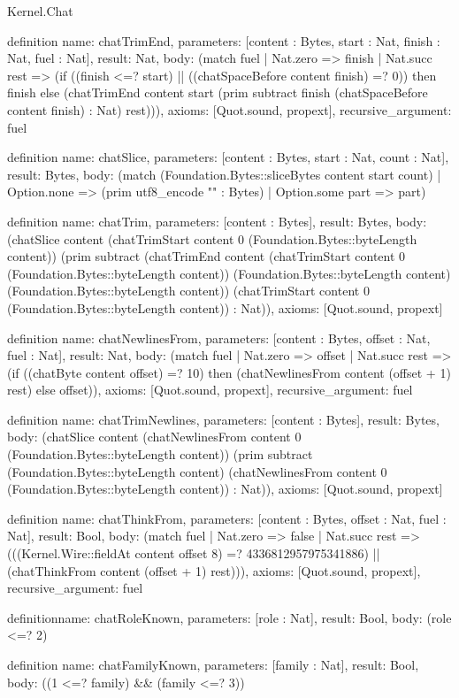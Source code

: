 \begin{lexlean}{Kernel.Chat}
\begin{semanticmodule}
definition{
  name: chatTrimEnd,
  parameters: [content : Bytes, start : Nat, finish : Nat, fuel : Nat],
  result: Nat,
  body: (match fuel
    | Nat.zero => finish
    | Nat.succ rest => (if ((finish <=? start) || ((chatSpaceBefore content finish) =? 0)) then finish else (chatTrimEnd content start (prim subtract finish (chatSpaceBefore content finish) : Nat) rest))),
  axioms: [Quot.sound, propext],
  recursive_argument: fuel
}

definition{
  name: chatSlice,
  parameters: [content : Bytes, start : Nat, count : Nat],
  result: Bytes,
  body: (match (Foundation.Bytes::sliceBytes content start count)
    | Option.none => (prim utf8_encode "" : Bytes)
    | Option.some part => part)
}

definition{
  name: chatTrim,
  parameters: [content : Bytes],
  result: Bytes,
  body: (chatSlice content (chatTrimStart content 0 (Foundation.Bytes::byteLength content)) (prim subtract (chatTrimEnd content (chatTrimStart content 0 (Foundation.Bytes::byteLength content)) (Foundation.Bytes::byteLength content) (Foundation.Bytes::byteLength content)) (chatTrimStart content 0 (Foundation.Bytes::byteLength content)) : Nat)),
  axioms: [Quot.sound, propext]
}

definition{
  name: chatNewlinesFrom,
  parameters: [content : Bytes, offset : Nat, fuel : Nat],
  result: Nat,
  body: (match fuel
    | Nat.zero => offset
    | Nat.succ rest => (if ((chatByte content offset) =? 10) then (chatNewlinesFrom content (offset + 1) rest) else offset)),
  axioms: [Quot.sound, propext],
  recursive_argument: fuel
}

definition{
  name: chatTrimNewlines,
  parameters: [content : Bytes],
  result: Bytes,
  body: (chatSlice content (chatNewlinesFrom content 0 (Foundation.Bytes::byteLength content)) (prim subtract (Foundation.Bytes::byteLength content) (chatNewlinesFrom content 0 (Foundation.Bytes::byteLength content)) : Nat)),
  axioms: [Quot.sound, propext]
}

definition{
  name: chatThinkFrom,
  parameters: [content : Bytes, offset : Nat, fuel : Nat],
  result: Bool,
  body: (match fuel
    | Nat.zero => false
    | Nat.succ rest => (((Kernel.Wire::fieldAt content offset 8) =? 4336812957975341886) || (chatThinkFrom content (offset + 1) rest))),
  axioms: [Quot.sound, propext],
  recursive_argument: fuel
}

definition{name: chatRoleKnown, parameters: [role : Nat], result: Bool, body: (role <=? 2)}

definition{
  name: chatFamilyKnown,
  parameters: [family : Nat],
  result: Bool,
  body: ((1 <=? family) && (family <=? 3))
}


\end{semanticmodule}
\end{lexlean}
